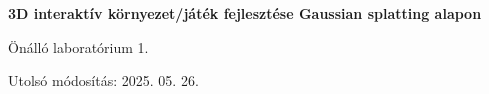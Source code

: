 
\begin{titlepage}
    \begin{center}
        \vspace*{1cm}
            
        \Huge
        \textbf{3D interaktív környezet/játék fejlesztése Gaussian splatting alapon}
            
        \vspace{0.5cm}
        \LARGE
        Önálló laboratórium 1.
            
        \vspace{2.5cm}
            
            
        \vfill
            
            
        \vspace{0.8cm}
            
            
        \Large
        Utolsó módosítás: 2025. 05. 26.
        \vspace*{1cm}
            
    \end{center}
\end{titlepage}

